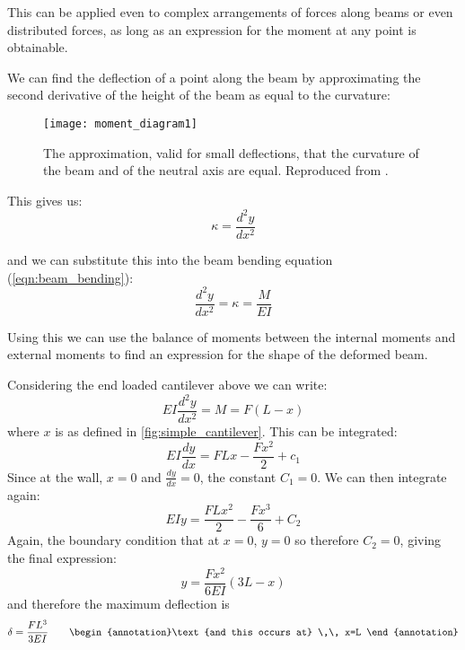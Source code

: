 This can be applied even to complex arrangements of forces along beams or even distributed forces, as long as an expression for the moment at any point is obtainable.

We can find the deflection of a point along the beam by approximating the second derivative of the height of the beam as equal to the curvature:
\FloatBarrier
\begin{figure}[h!]
\centering
\texttt{[image: moment\_diagram1]}
\caption{The approximation, valid for small deflections, that the curvature of the beam and of the neutral axis are equal. Reproduced from \cite{doitpoms_beams}.}
\end{figure}
\FloatBarrier

This gives us:
\begin{equation}
\kappa = \frac{d^2y}{dx^2}
\end{equation}

and we can substitute this into the beam bending equation (\autoref{eqn:beam_bending}):
\begin{equation}
\frac{d^2y}{dx^2}=\kappa = \frac{M}{EI} \label{eqn:beam_curvature}
\end{equation}

Using this we can use the balance of moments between the internal moments and external moments to find an expression for the shape of the deformed beam.

Considering the end loaded cantilever above we can write:
\begin{equation}
EI \frac{d^2y}{dx^2} = M = F(L-x)
\end{equation}
where $x$ is as defined in \autoref{fig:simple_cantilever}. This can be integrated:
\begin{equation}
EI\frac{dy}{dx} = FLx - \frac{Fx^2}{2} + c_1
\end{equation}
Since at the wall, $x=0$ and $\frac{dy}{dx} = 0$, the constant $C_1=0$. We can then integrate again:
\begin{equation}
EIy = \frac{FLx^2}{2} - \frac{Fx^3}{6} + C_2
\end{equation}
Again, the boundary condition that at $x=0$, $y=0$ so therefore $C_2=0$, giving the final expression:
\begin{equation}
y = \frac{Fx^2}{6EI}(3L-x)
\end{equation}
and therefore the maximum deflection is
\begin{equation}
\delta = \frac{FL^3}{3EI} \qquad \begin{annotation}\text{and this occurs at} \,\, x=L
\end{annotation}
\end{equation}


